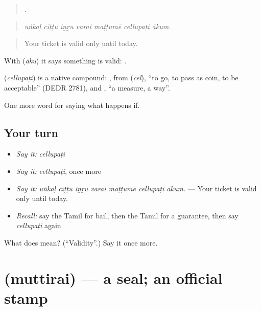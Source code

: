 \begin{quote}
      .
\end{quote}

\begin{quote}
\emph{uṅkaḷ cīṭṭu iṉṟu varai maṭṭumē cellupaṭi ākum.}
\end{quote}

\begin{quote}
Your ticket is valid only until today.
\end{quote}

With  (\emph{āku}) it says something is valid:  .

\begin{cousinweb}
\textbf{} (\emph{cellupaṭi}) is a native compound: , from  (\emph{cel}), \textquotedblleft{}to go, to pass as coin, to be acceptable\textquotedblright{} (DEDR 2781), and , \textquotedblleft{}a measure, a way\textquotedblright{}.
\end{cousinweb}

\begin{grammarlens}[title={What you've built}]
One more word for saying what happens if.
\end{grammarlens}

\subsection*{Your turn}
\begin{itemize}
\raggedright
  \item \emph{Say it:} \emph{cellupaṭi}
  \item \emph{Say it:} \emph{cellupaṭi}, once more
  \item \emph{Say it:} \emph{uṅkaḷ cīṭṭu iṉṟu varai maṭṭumē cellupaṭi ākum.} — Your ticket is valid only until today.
  \item \emph{Recall:} say the Tamil for bail, then the Tamil for a guarantee, then say \emph{cellupaṭi} again
\end{itemize}

\begin{tcolorbox}[breakable,colback=teal!4,colframe=teal!35!black,title={Before you move on}]
What does  mean? (\textquotedblleft{}Validity\textquotedblright{}.) Say it once more.
\end{tcolorbox}
\section[\texorpdfstring{\ta{முத்திரை} (muttirai)}{முத்திரை (muttirai)}]{ (muttirai) — a seal; an official stamp}

